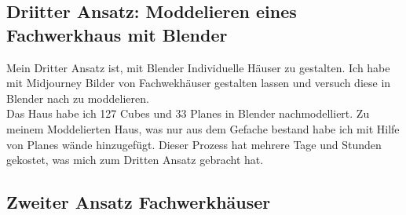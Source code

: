 \subsection{Driitter Ansatz: Moddelieren eines Fachwerkhaus mit Blender}
Mein Dritter Ansatz ist, mit Blender Individuelle Häuser zu gestalten. Ich habe mit Midjourney Bilder von Fachwekhäuser gestalten lassen und versuch diese in Blender nach zu moddelieren.
\\
Das Haus habe ich 127 Cubes und 33 Planes in Blender nachmodelliert. Zu meinem Moddelierten Haus, was nur aus dem Gefache bestand habe ich mit Hilfe von Planes wände hinzugefügt.
Dieser Prozess hat mehrere Tage und Stunden gekostet, was mich zum Dritten Ansatz gebracht hat.

\subsection{Zweiter Ansatz Fachwerkhäuser}%

